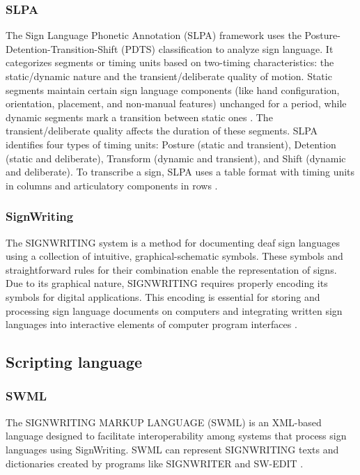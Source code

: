 \subsubsection{SLPA}

The Sign Language Phonetic Annotation (SLPA) framework uses the Posture-Detention-Transition-Shift (PDTS) classification to analyze sign language. It categorizes segments or timing units based on two-timing characteristics: the static/dynamic nature and the transient/deliberate quality of motion. Static segments maintain certain sign language components (like hand configuration, orientation, placement, and non-manual features) unchanged for a period, while dynamic segments mark a transition between static ones \parencite{naert2020survey}. The transient/deliberate quality affects the duration of these segments. SLPA identifies four types of timing units: Posture (static and transient), Detention (static and deliberate), Transform (dynamic and transient), and Shift (dynamic and deliberate). To transcribe a sign, SLPA uses a table format with timing units in columns and articulatory components in rows \parencite{johnson2011segmental}.

\subsubsection{SignWriting}

The SIGNWRITING system is a method for documenting deaf sign languages using a collection of intuitive, graphical-schematic symbols. These symbols and straightforward rules for their combination enable the representation of signs. Due to its graphical nature, SIGNWRITING requires properly encoding its symbols for digital applications. This encoding is essential for storing and processing sign language documents on computers and integrating written sign languages into interactive elements of computer program interfaces \parencite{da2003signwriting}.

\subsection{Scripting language}


\subsubsection{SWML}

The SIGNWRITING MARKUP LANGUAGE (SWML) is an XML-based language designed to facilitate interoperability among systems that process sign languages using SignWriting. SWML can represent SIGNWRITING texts and dictionaries created by programs like SIGNWRITER and SW-EDIT \parencite{da2003signwriting}.

